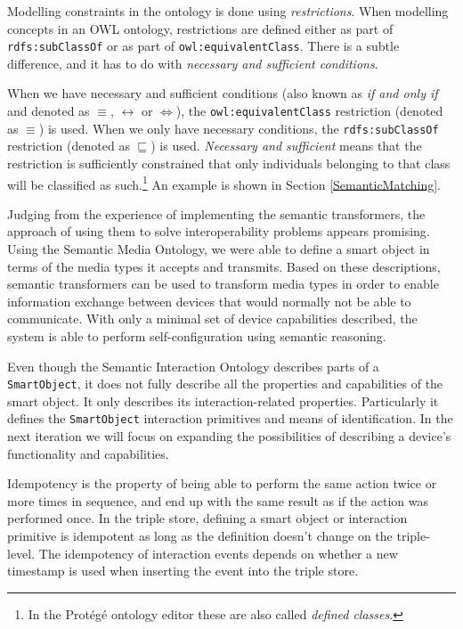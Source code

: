 Modelling constraints in the ontology is done using \emph{restrictions}.  When modelling concepts in an \ac{OWL} ontology, restrictions are defined either as part of \texttt{rdfs:subClassOf} or as part of \texttt{owl:equivalentClass}. There is a subtle difference, and it has to do with \emph{necessary and sufficient conditions}.

When we have necessary and sufficient conditions (also known as \emph{if and only if} and denoted as $ \equiv $, $ \leftrightarrow $ or $ \Leftrightarrow $), the \texttt{owl:equivalentClass} restriction (denoted as $ \equiv $) is used. When we only have necessary conditions, the \texttt{rdfs:subClassOf} restriction (denoted as $ \sqsubseteq $) is used. \emph{Necessary and sufficient} means that the restriction is sufficiently constrained that only individuals belonging to that class will be classified as such.\footnote{In the Prot\'eg\'e ontology editor these are also called \emph{defined classes}.} An example is shown in Section \ref{SemanticMatching}.

Judging from the experience of implementing the semantic transformers, the approach of using them to solve interoperability problems appears promising. Using the Semantic Media Ontology, we were able to define a smart object in terms of the media types it accepts and transmits. Based on these descriptions, semantic transformers can be used to transform media types in order to enable information exchange between devices that would normally not be able to communicate. With only a minimal set of device capabilities described, the system is able to perform self-configuration using semantic reasoning.

Even though the Semantic Interaction Ontology describes parts of a \texttt{SmartObject}, it does not fully describe all the properties and capabilities of the smart object. It only describes its interaction-related properties. Particularly it defines the \texttt{SmartObject} interaction primitives and means of identification. In the next iteration we will focus on expanding the possibilities of describing a device's functionality and capabilities.

Idempotency is the property of being able to perform the same action twice or more times in sequence, and end up with the same result as if the action was performed once. In the triple store, defining a smart object or interaction primitive is idempotent as long as the definition  doesn't change on the triple-level. The idempotency of interaction events depends on whether a new timestamp is used when inserting the event into the triple store.



